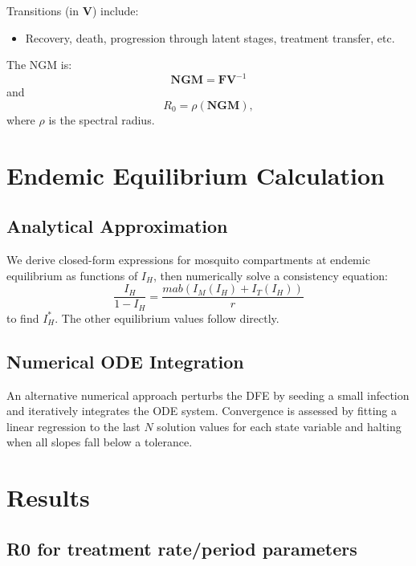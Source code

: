 \documentclass[12pt]{article}
\begin{document}
Transitions (in \(\mathbf{V}\)) include:
\begin{itemize}
    \item Recovery, death, progression through latent stages, treatment transfer, etc.
\end{itemize}

The NGM is:
\[
\mathbf{NGM} = \mathbf{F} \mathbf{V}^{-1}
\]
and
\[
R_0 = \rho(\mathbf{NGM}),
\]
where \(\rho\) is the spectral radius.

\section{Endemic Equilibrium Calculation}

\subsection{Analytical Approximation}

We derive closed-form expressions for mosquito compartments at endemic equilibrium as functions of \(I_H\), then numerically solve a consistency equation:
\[
\frac{I_H}{1-I_H} = \frac{m a b (I_M(I_H) + I_T(I_H))}{r}
\]
to find \(I_H^*\). The other equilibrium values follow directly.

\subsection{Numerical ODE Integration}

An alternative numerical approach perturbs the DFE by seeding a small infection and iteratively integrates the ODE system. Convergence is assessed by fitting a linear regression to the last \(N\) solution values for each state variable and halting when all slopes fall below a tolerance.

\section{Results}

\subsection{R0 for treatment rate/period parameters}
\end{document}
